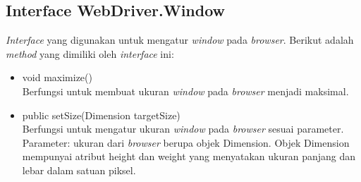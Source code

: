 
\subsection{Interface WebDriver.Window}
\label{subsec:webdriveroption}
\textit{Interface} yang digunakan untuk mengatur \textit{window} pada \textit{browser}. Berikut adalah \textit{method} yang dimiliki oleh \textit{interface} ini:
\begin{itemize}
\item void maximize()\\
Berfungsi untuk membuat ukuran \textit{window} pada \textit{browser} menjadi maksimal.
\item public setSize(Dimension targetSize)\\
Berfungsi untuk mengatur ukuran \textit{window} pada \textit{browser} sesuai parameter.\\
Parameter: ukuran dari \textit{browser} berupa objek Dimension. Objek Dimension mempunyai atribut height dan weight yang menyatakan ukuran panjang dan lebar dalam satuan piksel.
\end{itemize}

